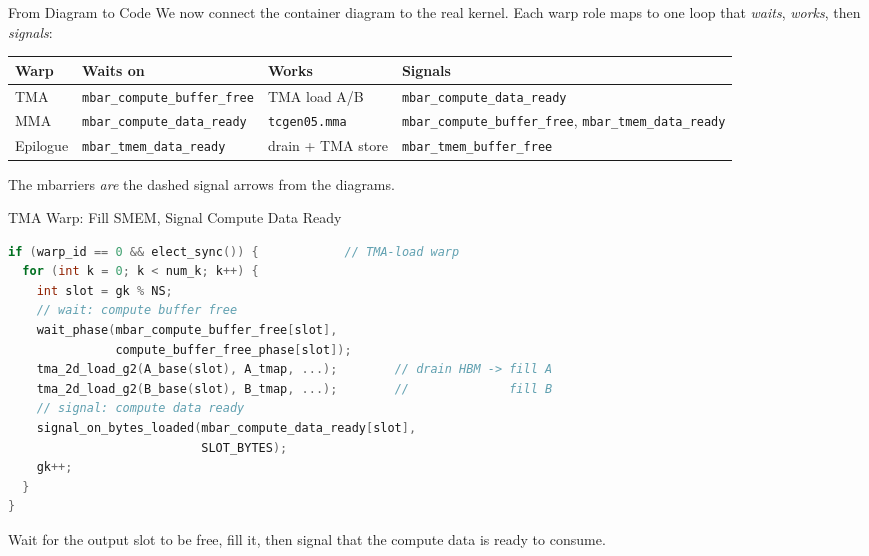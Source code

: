 \documentclass[aspectratio=169,professionalfonts]{beamer}
\newcommand{\code}[1]{\texttt{#1}}
\begin{document}
\begin{frame}{From Diagram to Code}
  We now connect the container diagram to the real kernel. Each warp role maps
  to one loop that \emph{waits}, \emph{works}, then \emph{signals}:

  \vspace{0.3cm}
  \begin{table}
    \centering\scriptsize
    \setlength{\tabcolsep}{3pt}
    \begin{tabular}{llll}
      \toprule
      Warp & Waits on & Works & Signals \\
      \midrule
      TMA & \code{mbar\_compute\_buffer\_free} & TMA load A/B & \code{mbar\_compute\_data\_ready} \\
      MMA & \code{mbar\_compute\_data\_ready} & \code{tcgen05.mma} & \code{mbar\_compute\_buffer\_free}, \code{mbar\_tmem\_data\_ready} \\
      Epilogue & \code{mbar\_tmem\_data\_ready} & drain + TMA store & \code{mbar\_tmem\_buffer\_free} \\
      \bottomrule
    \end{tabular}
  \end{table}

  \vspace{0.2cm}
  The mbarriers \emph{are} the dashed signal arrows from the diagrams.
\end{frame}

\begin{frame}[fragile]{TMA Warp: Fill SMEM, Signal Compute Data Ready}
  \begin{lstlisting}[language=C,basicstyle=\ttfamily\footnotesize]
if (warp_id == 0 && elect_sync()) {            // TMA-load warp
  for (int k = 0; k < num_k; k++) {
    int slot = gk % NS;
    // wait: compute buffer free
    wait_phase(mbar_compute_buffer_free[slot],
               compute_buffer_free_phase[slot]);
    tma_2d_load_g2(A_base(slot), A_tmap, ...);        // drain HBM -> fill A
    tma_2d_load_g2(B_base(slot), B_tmap, ...);        //              fill B
    // signal: compute data ready
    signal_on_bytes_loaded(mbar_compute_data_ready[slot],
                           SLOT_BYTES);
    gk++;
  }
}
  \end{lstlisting}
  \vspace{-0.2cm}
  \footnotesize Wait for the output slot to be free, fill it, then signal
  that the compute data is ready to consume.
\end{frame}
\end{document}
